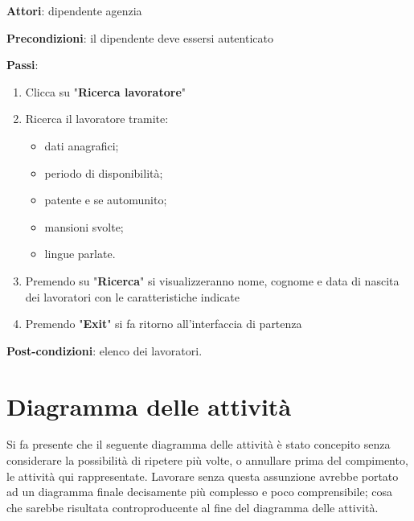 \documentclass{article}
\begin{document}
    \begin{framed}
        \item[] \textbf{Attori}: dipendente agenzia
            \item[] \textbf{Precondizioni}: il dipendente deve essersi autenticato
            \item[] \textbf{Passi}: \begin{enumerate}
                \item Clicca su "\textbf{Ricerca lavoratore}"
                \item Ricerca il lavoratore tramite:
                \begin{itemize}
                    \item dati anagrafici;
                    \item periodo di disponibilità;
                    \item patente e se automunito;
                    \item mansioni svolte;
                    \item lingue parlate.
                \end{itemize}
                \item Premendo su "\textbf{Ricerca}" si visualizzeranno nome, cognome e data di nascita dei lavoratori con le caratteristiche indicate
                \item Premendo "\textbf{Exit}" si fa ritorno all'interfaccia di partenza
            \end{enumerate}
            \item[] \textbf{Post-condizioni}: elenco dei lavoratori.
    \end{framed}

       

    \section{Diagramma delle attività}

    Si fa presente che il seguente diagramma delle attività è stato concepito senza considerare la possibilità di ripetere
più volte, o annullare prima del compimento, le attività qui rappresentate. Lavorare senza questa
assunzione avrebbe portato ad un diagramma finale decisamente più complesso e poco comprensibile; cosa che
sarebbe risultata controproducente al fine del diagramma delle attività.
\end{document}
